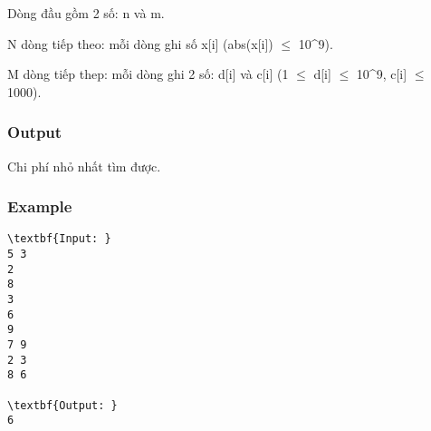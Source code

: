Dòng đầu gồm 2 số: n và m.

N dòng tiếp theo: mỗi dòng ghi số x[i] (abs(x[i])  $\le$  10\textasciicircum9).

M dòng tiếp thep: mỗi dòng ghi 2 số: d[i] và c[i] (1  $\le$  d[i]  $\le$  10\textasciicircum9, c[i]  $\le$  1000).

\subsubsection{\textbf{Output }}

Chi phí nhỏ nhất tìm được.

\subsubsection{Example}
\begin{verbatim}
\textbf{Input: }
5 3
2
8
3
6
9
7 9
2 3
8 6

\textbf{Output: }
6\end{verbatim}
